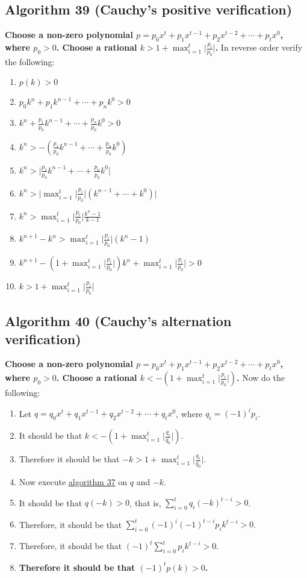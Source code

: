 \documentclass[twocolumn]{article}
\begin{document}
		\subsection{Algorithm 39 (Cauchy's positive verification)}\label{sec:algorithm 39}
			\textbf{Choose a non-zero polynomial $p=p_0x^t+p_1x^{t-1}+p_2x^{t-2}+\cdots+p_tx^0$, where $p_0>0$. Choose a rational $k>1+\max_{i=1}^t\lvert\frac{p_i}{p_0}\rvert$.} In reverse order verify the following:
			\begin{enumerate}
				\item \textbf{$p(k)>0$}
				\item $p_0k^n+p_1k^{n-1}+\cdots+p_nk^0>0$
				\item $k^n+\frac{p_1}{p_0}k^{n-1}+\cdots+\frac{p_n}{p_0}k^0>0$
				\item $k^n>-(\frac{p_1}{p_0}k^{n-1}+\cdots+\frac{p_n}{p_0}k^0)$
				\item $k^n>\lvert \frac{p_1}{p_0}k^{n-1}+\cdots+\frac{p_n}{p_0}k^0\rvert$
				\item $k^n>\lvert\max_{i=1}^t\lvert \frac{p_i}{p_0}\rvert(k^{n-1}+\cdots+k^0)\rvert$
				\item $k^n>\max_{i=1}^t\lvert \frac{p_i}{p_0}\rvert\frac{k^n-1}{k-1}$
				\item $k^{n+1}-k^n>\max_{i=1}^t\lvert \frac{p_i}{p_0}\rvert(k^n-1)$
				\item $k^{n+1}-(1+\max_{i=1}^t\lvert \frac{p_i}{p_0}\rvert)k^n+\max_{i=1}^t\lvert \frac{p_i}{p_0}\rvert>0$
				\item $k>1+\max_{i=1}^t\lvert \frac{p_i}{p_0}\rvert$
			\end{enumerate}
		\subsection{Algorithm 40 (Cauchy's alternation verification)}\label{sec:algorithm 40}
			\textbf{Choose a non-zero polynomial $p=p_0x^t+p_1x^{t-1}+p_2x^{t-2}+\cdots+p_tx^0$, where $p_0>0$. Choose a rational $k<-(1+\max_{i=1}^t\lvert\frac{p_i}{p_0}\rvert)$.} Now do the following:
			\begin{enumerate}
				\item Let $q=q_0x^t+q_1x^{t-1}+q_2x^{t-2}+\cdots+q_tx^0$, where $q_i=(-1)^ip_i$.
				\item It should be that $k<-(1+\max_{i=1}^t\lvert\frac{q_i}{q_0}\rvert)$.
				\item Therefore it should be that $-k>1+\max_{i=1}^t\lvert\frac{q_i}{q_0}\rvert$.
				\item Now execute \hyperref[sec:algorithm 37]{algorithm 37} on $q$ and $-k$.
				\item It should be that $q(-k)>0$, that is, $\sum_{i=0}^t q_i(-k)^{t-i}>0$.
				\item Therefore, it should be that $\sum_{i=0}^t (-1)^i(-1)^{t-i}p_ik^{t-i}>0$.
				\item Therefore, it should be that $(-1)^t\sum_{i=0}^t p_ik^{t-i}>0$.
				\item \textbf{Therefore it should be that $(-1)^tp(k)>0$.}
			\end{enumerate}
\end{document}
